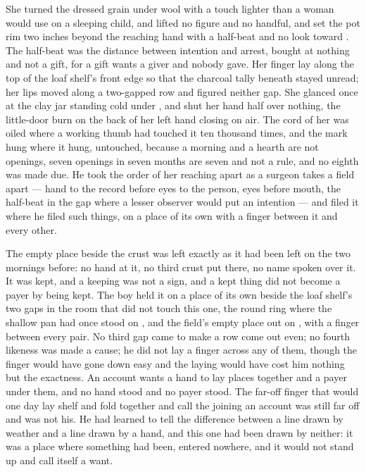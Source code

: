 She turned the dressed grain under wool with a touch lighter than a woman would use on a sleeping child, and lifted no figure and no handful, and set the pot rim two inches beyond the reaching hand with a half-beat and no look toward . The half-beat was the distance between intention and arrest, bought at nothing and not a gift, for a gift wants a giver and nobody gave. Her finger lay along the top of the loaf shelf's front edge so that the charcoal tally beneath stayed unread; her lips moved along a two-gapped row and figured neither gap. She glanced once at the clay jar standing cold under , and shut her hand half over nothing, the little-door burn on the back of her left hand closing on air. The cord of her  was oiled where a working thumb had touched it ten thousand times, and the mark hung where it hung, untouched, because a morning and a hearth are not openings, seven openings in seven months are seven and not a rule, and no eighth was made due. He took the order of her reaching apart as a surgeon takes a field apart --- hand to the record before eyes to the person, eyes before mouth, the half-beat in the gap where a lesser observer would put an intention --- and filed it where he filed such things, on a place of its own with a finger between it and every other.

\scenebreak

The empty place beside the crust was left exactly as it had been left on the two mornings before: no hand at it, no third crust put there, no name spoken over it. It was kept, and a keeping was not a sign, and a kept thing did not become a payer by being kept. The boy held it on a place of its own beside the loaf shelf's two gaps in the room that did not touch this one, the round ring where the shallow pan had once stood on , and the field's empty place out on , with a finger between every pair. No third gap came to make a row come out even; no fourth likeness was made a cause; he did not lay a finger across any of them, though the finger would have gone down easy and the laying would have cost him nothing but the exactness. An account wants a hand to lay places together and a payer under them, and no hand stood and no payer stood. The far-off finger that would one day lay shelf and fold together and call the joining an account was still far off and was not his. He had learned to tell the difference between a line drawn by weather and a line drawn by a hand, and this one had been drawn by neither: it was a place where something had been, entered nowhere, and it would not stand up and call itself a want.

